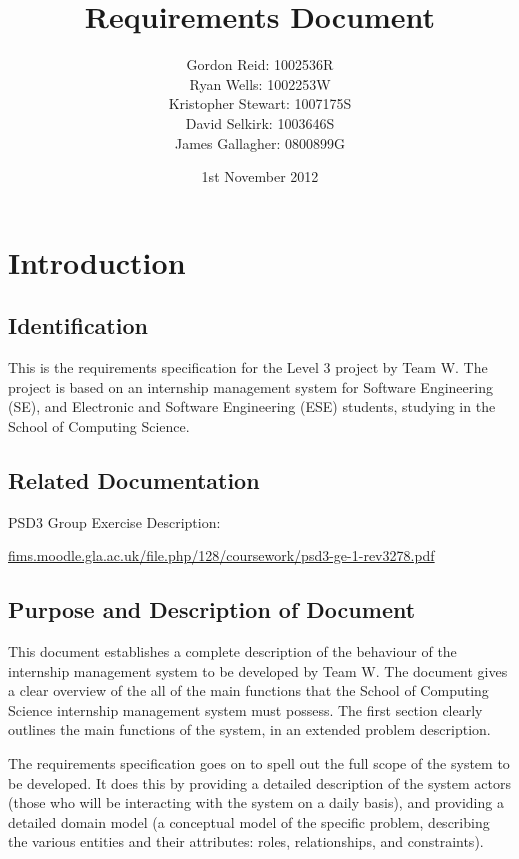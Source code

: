 \documentclass{l3deliverable}
\title{Requirements Document}
\author{
    Gordon Reid: 1002536R\\
    Ryan Wells: 1002253W\\
    Kristopher Stewart: 1007175S\\
    David Selkirk: 1003646S\\
    James Gallagher: 0800899G\\
}
\date{1st November 2012}
\begin{document}

\maketitle

\tableofcontents

\newpage


\section{Introduction}

\subsection{Identification}

This is the requirements specification for the Level 3 project by Team W. The
project is based on an internship management system for Software Engineering
(SE), and Electronic and Software Engineering (ESE) students, studying in the
School of Computing Science.

\subsection{Related Documentation}

PSD3 Group Exercise Description:

\url{fims.moodle.gla.ac.uk/file.php/128/coursework/psd3-ge-1-rev3278.pdf}

\subsection{Purpose and Description of Document}

This document establishes a complete description of the behaviour of the
internship management system to be developed by Team W. The document gives a
clear overview of the all of the main functions that the School of Computing
Science internship management system must possess. The first section clearly
outlines the main functions of the system, in an extended problem description.  

The requirements specification goes on to spell out the full scope of the system
to be developed. It does this by providing a detailed description of the system
actors (those who will be interacting with the system on a daily basis), and
providing a detailed domain model (a conceptual model of the specific problem,
describing the various entities and their attributes: roles, relationships, and
constraints). 
\end{document}
